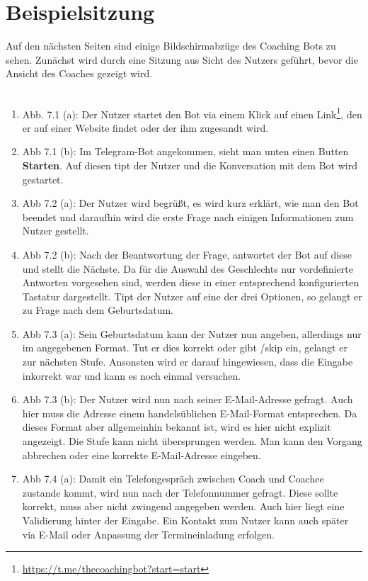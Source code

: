 \label{Beispiele}
\chapter{Beispielsitzung}

	Auf den nächsten Seiten sind einige Bildschirmabzüge des Coaching Bots zu sehen. Zunächst wird durch eine Sitzung aus Sicht des Nutzers geführt, bevor die Ansicht des Coaches gezeigt wird.\\ 
	\\
	\begin{enumerate}
		\item Abb. 7.1 (a): Der Nutzer startet den Bot via einem Klick auf einen Link\footnote{\url{https://t.me/thecoachingbot?start=start}}, den er auf einer Website findet oder der ihm zugesandt wird.
		\item Abb 7.1 (b): Im Telegram-Bot angekommen, sieht man unten einen Butten \textbf{Starten}. Auf diesen tipt der Nutzer und die Konversation mit dem Bot wird gestartet.
		\item Abb 7.2 (a): Der Nutzer wird begrüßt, es wird kurz erklärt, wie man den Bot beendet und daraufhin wird die erste Frage nach einigen Informationen zum Nutzer gestellt.
		\item Abb 7.2 (b): Nach der Beantwortung der Frage, antwortet der Bot auf diese und stellt die Nächste. Da für die Auswahl des Geschlechts nur vordefinierte Antworten vorgesehen sind, werden diese in einer entsprechend konfigurierten Tastatur dargestellt. Tipt der Nutzer auf eine der drei Optionen, so gelangt er zu Frage nach dem Geburtsdatum.
		\item Abb 7.3 (a): Sein Geburtsdatum kann der Nutzer nun angeben, allerdings nur im angegebenen Format. Tut er dies korrekt oder gibt /skip ein, gelangt er zur nächsten Stufe. Ansonsten wird er darauf hingewiesen, dass die Eingabe inkorrekt war und kann es noch einmal versuchen. 
		\item Abb 7.3 (b): Der Nutzer wird nun nach seiner E-Mail-Adresse gefragt. Auch hier muss die Adresse einem handelsüblichen E-Mail-Format entsprechen. Da dieses Format aber allgemeinhin bekannt ist, wird es hier nicht explizit angezeigt. Die Stufe kann nicht übersprungen werden. Man kann den Vorgang abbrechen oder eine korrekte E-Mail-Adresse eingeben.
		\item Abb 7.4 (a): Damit ein Telefongespräch zwischen Coach und Coachee zustande kommt, wird nun nach der Telefonnummer gefragt. Diese sollte korrekt, muss aber nicht zwingend angegeben werden. Auch hier liegt eine Validierung hinter der Eingabe. Ein Kontakt zum Nutzer kann auch später via E-Mail oder Anpassung der Termineinladung erfolgen. 

\end{enumerate}
